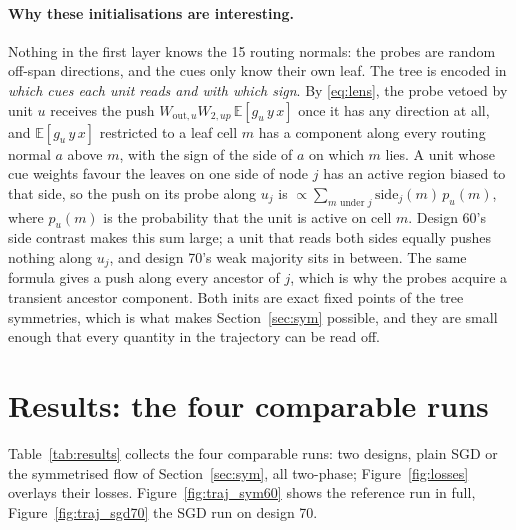\documentclass[10pt,a4paper]{article}
\newcommand{\E}{\mathbb{E}}
\begin{document}
\paragraph{Why these initialisations are interesting.} Nothing in the first layer knows the 15 routing normals: the probes are random off-span directions, and the cues only know their own leaf. The tree is encoded in \emph{which cues each unit reads and with which sign}. By \eqref{eq:lens}, the probe vetoed by unit $u$ receives the push $W_{\mathrm{out},u}W_{2,up}\,\E[g_u\, y\, x]$ once it has any direction at all, and $\E[g_u\,y\,x]$ restricted to a leaf cell $m$ has a component along every routing normal $a$ above $m$, with the sign of the side of $a$ on which $m$ lies. A unit whose cue weights favour the leaves on one side of node $j$ has an active region biased to that side, so the push on its probe along $u_j$ is $\propto\sum_{m\text{ under }j}\mathrm{side}_j(m)\,p_u(m)$, where $p_u(m)$ is the probability that the unit is active on cell $m$. Design 60's side contrast makes this sum large; a unit that reads both sides equally pushes nothing along $u_j$, and design 70's weak majority sits in between. The same formula gives a push along every ancestor of $j$, which is why the probes acquire a transient ancestor component. Both inits are exact fixed points of the tree symmetries, which is what makes Section~\ref{sec:sym} possible, and they are small enough that every quantity in the trajectory can be read off.

\section{Results: the four comparable runs}
\label{sec:results}
Table~\ref{tab:results} collects the four comparable runs: two designs, plain SGD or the symmetrised flow of Section~\ref{sec:sym}, all two-phase; Figure~\ref{fig:losses} overlays their losses. Figure~\ref{fig:traj_sym60} shows the reference run in full, Figure~\ref{fig:traj_sgd70} the SGD run on design 70.
\end{document}
